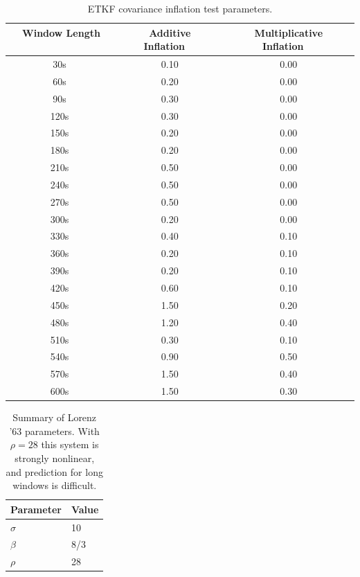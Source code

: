 \begin{table}[h!]
\caption[ETKF covariance inflation test parameters]{ETKF covariance inflation test parameters.}
\begin{center}
\begin{tabular}{ccc}
\hline
{\bf Window Length ~~~~} & {\bf Additive Inflation~~} & {\bf Multiplicative Inflation~~}\\
\hline
\hline
~30s ~& 0.10 & 0.00 \\ \hline
~60s ~& 0.20 & 0.00 \\ \hline
~90s ~& 0.30 & 0.00 \\ \hline
~120s ~& 0.30 & 0.00 \\ \hline
~150s ~& 0.20 & 0.00 \\ \hline
~180s ~& 0.20 & 0.00 \\ \hline
~210s ~& 0.50 & 0.00 \\ \hline
~240s ~& 0.50 & 0.00 \\ \hline
~270s ~& 0.50 & 0.00 \\ \hline
~300s ~& 0.20 & 0.00 \\ \hline
~330s ~& 0.40 & 0.10 \\ \hline
~360s ~& 0.20 & 0.10 \\ \hline
~390s ~& 0.20 & 0.10 \\ \hline
~420s ~& 0.60 & 0.10 \\ \hline
~450s ~& 1.50 & 0.20 \\ \hline
~480s ~& 1.20 & 0.40 \\ \hline
~510s ~& 0.30 & 0.10 \\ \hline
~540s ~& 0.90 & 0.50 \\ \hline
~570s ~& 1.50 & 0.40 \\ \hline
~600s ~& 1.50 & 0.30 \\
\hline
\end{tabular}
\end{center}
\label{table:ETKFCovInfl}
\end{table} 

\begin{table}[h]
\caption[Summary of Lorenz '63 parameters]
  {
    Summary of Lorenz '63 parameters.
    With $\rho=28$ this system is strongly nonlinear, and prediction for long windows is difficult.
  }
\label{table:lorenz63params}
\begin{center}
\begin{tabular}{ll} %
\hline
Parameter & Value \\ %
\hline
\hline
$\sigma$ & 10 \\%
\hline
$\beta$ & 8/3 \\%
\hline
$\rho$ & 28 \\%
\hline
\end{tabular}
\end{center}
\end{table}



